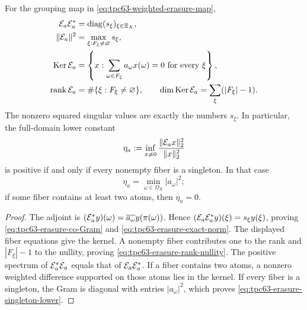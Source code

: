 \begin{theorem}
\label{thm:tpc63-erasure-fiber-tests}
For the grouping map in \eqref{eq:tpc63-weighted-erasure-map},
\begin{align}
 \mathcal E_a\mathcal E_a^*
 &=\operatorname{diag}(s_\xi)_{\xi\in\Xi_X},
 \label{eq:tpc63-erasure-co-Gram}\\
 \|\mathcal E_a\|^2
 &=\max_{\xi:F_\xi\ne\varnothing}s_\xi,
 \label{eq:tpc63-erasure-exact-norm}\\
 \operatorname{Ker}\mathcal E_a
 &=\left\{x:
       \sum_{\omega\in F_\xi}a_\omega x(\omega)=0
       \text{ for every }\xi\right\},
 \label{eq:tpc63-erasure-exact-kernel}\\
 \operatorname{rank}\mathcal E_a
 &=\#\{\xi:F_\xi\ne\varnothing\},
 \qquad
 \dim\operatorname{Ker}\mathcal E_a
 =\sum_\xi(|F_\xi|-1).
 \label{eq:tpc63-erasure-rank-nullity}
\end{align}
The nonzero squared singular values are exactly the numbers \(s_\xi\).
In particular, the full-domain lower constant
\begin{equation}
 \eta_a:=\inf_{x\ne0}
            \frac{\|\mathcal E_ax\|_2^2}{\|x\|_2^2}
 \label{eq:tpc63-erasure-full-lower-constant}
\end{equation}
is positive if and only if every nonempty fiber is a singleton.  In that
case
\begin{equation}
 \eta_a=\min_{\omega\in\Omega_X}|a_\omega|^2;
 \label{eq:tpc63-erasure-singleton-lower}
\end{equation}
if some fiber contains at least two atoms, then \(\eta_a=0\).
\end{theorem}

\begin{proof}
The adjoint is
\((\mathcal E_a^*y)(\omega)=\overline{a_\omega}y(\pi(\omega))\).
Hence \((\mathcal E_a\mathcal E_a^*y)(\xi)=s_\xi y(\xi)\), proving
\eqref{eq:tpc63-erasure-co-Gram} and
\eqref{eq:tpc63-erasure-exact-norm}.  The displayed fiber equations give
the kernel.  A nonempty fiber contributes one to the rank and
\(|F_\xi|-1\) to the nullity, proving
\eqref{eq:tpc63-erasure-rank-nullity}.  The positive spectrum of
\(\mathcal E_a^*\mathcal E_a\) equals that of \(\mathcal E_a\mathcal E_a^*\).  If a fiber contains
two atoms, a nonzero weighted difference supported on those atoms lies in
the kernel.  If every fiber is a singleton, the Gram is diagonal with
entries \(|a_\omega|^2\), which proves
\eqref{eq:tpc63-erasure-singleton-lower}.
\end{proof}

